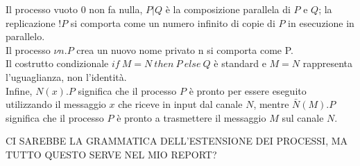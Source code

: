 Il processo vuoto 0 non fa nulla, $P|Q$ è la composizione parallela di $P$ e $Q$; la replicazione $!P$ si comporta come un numero infinito di copie di $P$ in esecuzione in parallelo.\\ 
Il processo $\nu n.P$ crea un nuovo nome privato n si comporta come P.\\
Il costrutto condizionale $if \: M = N \: then \: P \: else \: Q$ è standard e $M=N$ rappresenta l'uguaglianza, non l'identità.\\
Infine, $N(x).P$ significa che il processo $P$ è pronto per essere eseguito utilizzando il messaggio $x$ che riceve in input dal canale $N$, mentre $\bar{N}(M).P$ significa che il processo $P$ è pronto a trasmettere il messaggio $M$ sul canale $N$.

\bigskip
CI SAREBBE LA GRAMMATICA DELL'ESTENSIONE DEI PROCESSI, MA TUTTO QUESTO SERVE NEL MIO REPORT?




